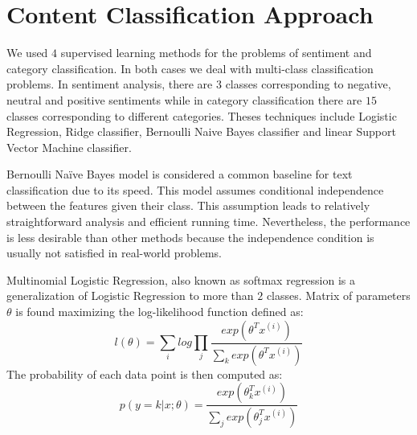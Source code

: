 ﻿\section{Content Classification Approach}
\label{sec:approach}
We used $4$ supervised learning methods for the problems of sentiment and category classification.
In both cases we deal with multi-class classification problems. In sentiment analysis, there are $3$ classes corresponding to negative, neutral and positive sentiments while in category classification there are $15$ classes corresponding to different categories.
Theses techniques include Logistic Regression, Ridge classifier, Bernoulli Naive Bayes classifier and linear Support Vector Machine classifier.

Bernoulli Naïve Bayes model is considered a common baseline for text classification due to its speed.
This model assumes conditional independence between the features given their class. This assumption leads to relatively straightforward analysis and efficient running time. Nevertheless, the performance is less desirable than other methods because the independence condition is usually not satisfied in real-world problems.

%
%

Multinomial Logistic Regression, also known as softmax regression is a generalization of Logistic Regression to more than $2$ classes.
Matrix of parameters $\theta$ is found maximizing the log-likelihood function defined as:
\begin{equation}
	l(\theta) = \sum_i log \prod_j \frac{exp(\theta^Tx^{(i)})}{\sum_k exp(\theta^Tx^{(i)})}
\label{eq:softmax-likelihood}
\end{equation}
The probability of each data point is then computed as:
\begin{equation}
 p(y=k|x;\theta)=\frac{exp(\theta^T_k x^{(i)})}{\sum_j exp(\theta_j^T x^{(i)})}
\label{eq:softmax-prob}
\end{equation}

